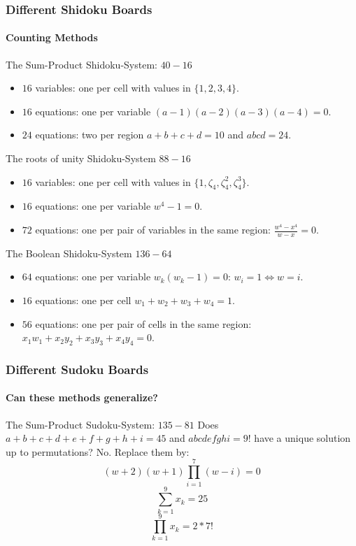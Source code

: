 \documentclass{beamer}
\newcommand{\Lra}{\Leftrightarrow}
\begin{document}
\begin{frame}
\frametitle{Different Shidoku Boards}
\framesubtitle{Counting Methods}
\begin{alertblock}{The Sum-Product Shidoku-System: $40-16$}
\begin{itemize}
\item $16$ variables: one per cell with values in $\{1,2,3,4\}$.
\item $16$ equations: one per variable $(a-1)(a-2)(a-3)(a-4) = 0$.
\item $24$ equations: two per region $a + b + c + d = 10$ and $abcd = 24$.
\end{itemize}
\end{alertblock}

\begin{alertblock}{The roots of unity Shidoku-System $88-16$}
\begin{itemize}
\item $16$ variables: one per cell with values in $\{1,\zeta_4,\zeta_4^2,\zeta_4^3\}$.
\item $16$ equations: one per variable $w^4 - 1 = 0$.
\item $72$ equations: one per pair of variables in the same region: $\frac{w^4-x^4}{w-x} = 0$.
\end{itemize}
\end{alertblock}

\begin{alertblock}{The Boolean Shidoku-System $136-64$}
\begin{itemize}
\item $64$ equations: one per variable $w_k(w_k-1) = 0$: $w_i = 1 \Lra w = i$.
\item $16$ equations: one per cell $w_1 + w_2 + w_3 + w_4 = 1$.
\item $56$ equations: one per pair of cells in the same region: $x_1w_1 + x_2y_2 + x_3y_3 + x_4y_4 = 0$.
\end{itemize}
\end{alertblock}
\end{frame}




\begin{frame}
\frametitle{Different Sudoku Boards}
\framesubtitle{Can these methods generalize?}
\begin{alertblock}{The Sum-Product Sudoku-System: $135-81$}
Does $a+b+c+d+e+f+g+h+i = 45$ and $abcdefghi = 9!$ have a unique solution up to permutations? No. Replace them by:
\[(w+2)(w+1)\prod_{i=1}^7 (w-i) = 0\]
\[\sum_{k=1}^9 x_k = 25\]
\[\prod_{k=1}^9 x_k = 2*7!\]
\end{alertblock}
\end{frame}
\end{document}
